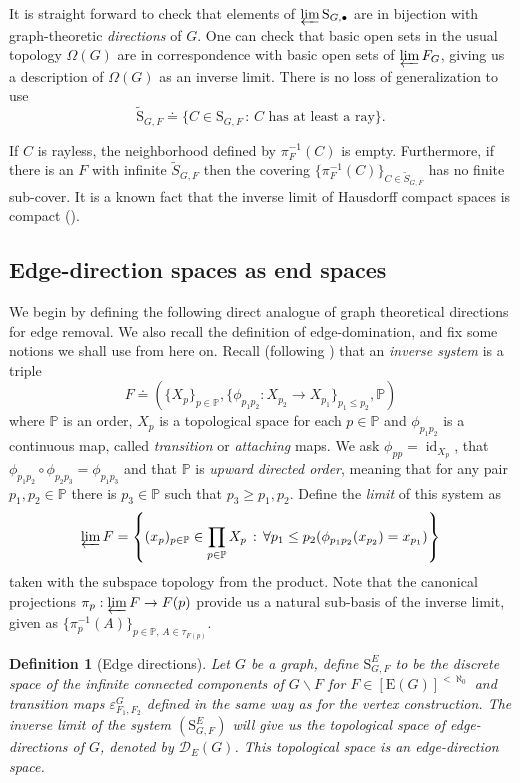 \documentclass[10pt]{article}
\numberwithin{equation}{subsection}
\newtheorem{definition}[equation]{Definition}
\theoremstyle{remark}
\DeclareMathOperator{\id}{id}
\newcommand{\st}{\, : \,}
\begin{document}
It is straight forward to check that elements of $\varprojlim \mathrm{S}_{G,\bullet}$ are in bijection with graph-theoretic \emph{directions} of $G$. One can check that basic open sets in the usual topology $\Omega(G)$ are in correspondence with basic open sets of $\varprojlim F_G$, giving us a description of $\Omega(G)$ as an inverse limit. There is no loss of generalization to use \[\tilde{\mathrm{S}}_{G,F} \doteq \{C \in \mathrm{S}_{G,F} \st C \text{ has at least a ray}\}.\] 

If $C$ is rayless, the neighborhood defined by $\pi_{F}^{-1}(C)$ is empty. Furthermore, if there is an $F$ with infinite $\tilde{S}_{G,F}$ then the covering $\{\pi_{F}^{-1}(C)\}_{C \in \tilde{S}_{G,F}}$ has no finite sub-cover. It is a known fact that the inverse limit of Hausdorff compact spaces is compact (\cite{eng}).

\subsection{Edge-direction spaces as end spaces}
\label{edgedirection}

\newcommand{\im}{\mathrm{im}}

We begin by defining the following direct analogue of graph theoretical directions for edge removal. We also recall the definition of edge-domination, and fix some notions we shall use from here on. Recall (following \cite{eng}) that an \emph{inverse system} is a triple \[F \doteq (\{X_p\}_{p \in \mathbb{P}},\{\phi_{p_1p_2}:X_{p_2}\to X_{p_1}\}_{p_1 \leq p_2}, \mathbb{P})\] where $\mathbb{P}$ is an order, $X_p$ is a topological space for each $p \in \mathbb{P}$ and $\phi_{p_1p_2}$ is a continuous map, called \emph{transition} or \emph{attaching} maps. We ask $\phi_{pp}= \id_{X_p}$, that $\phi_{p_1p_2} \circ \phi_{p_2p_3} = \phi_{p_1p_3}$ and that $\mathbb{P}$ is \emph{upward directed order}, meaning that for any pair $p_1,p_2 \in \mathbb{P}$ there is $p_3 \in \mathbb{P}$ such that $p_3 \geq p_1,p_2$. Define the \emph{limit} of this system as
\[ \varprojlim F = 
    \left\{
    (x_p)_{p \in \mathbb{P}} \in \prod_{p \in \mathbb{P}}X_p \st 
    \forall p_1 \leq p_2 
        (\phi_{p_1p_2}(x_{p_2}) = x_{p_1}) 
    \right\}
\]
taken with the subspace topology from the product. Note that the canonical projections $\pi_p:\varprojlim F \to F(p)$ provide us a natural sub-basis of the inverse limit, given as $\{\pi_p^{-1}(A)\}_{p \in \mathbb{P},\, A \in \tau_{F(p)}}$. 

\begin{definition}[Edge directions]
    Let $G$ be a graph, define $\mathrm{S}^E_{G,F}$ to be the discrete space of the infinite connected components of $G\backslash F$ for $F \in [\mathrm{E}(G)]^{<\aleph_0}$ and transition maps $\varepsilon^G_{F_1,F_2}$ defined in the same way as for the vertex construction. The inverse limit of the system $(\mathrm{S}^E_{G,F})$ will give us the topological space of \emph{edge-directions} of $G$, denoted by $\mathcal{D}_E(G)$. This topological space is an \emph{edge-direction space}.
\end{definition}
\end{document}
